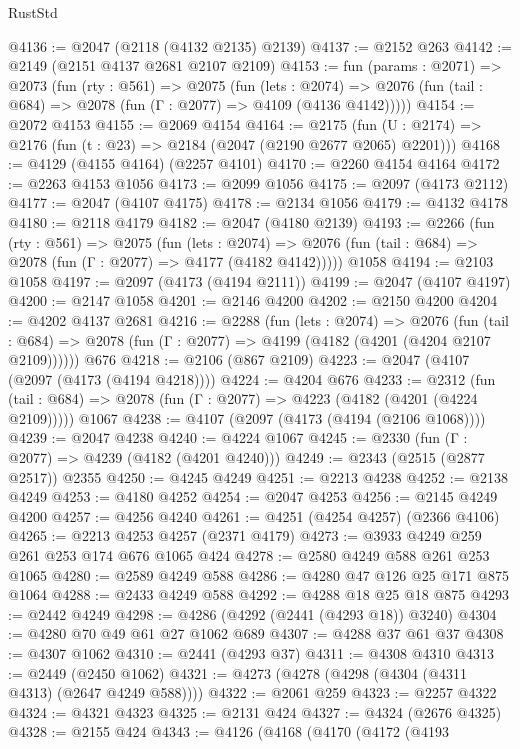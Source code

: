 \begin{lexlean}{RustStd}
\begin{coremodule}
@4136 := @2047 (@2118 (@4132 @2135) @2139)
@4137 := @2152 @263
@4142 := @2149 (@2151 @4137 @2681 @2107 @2109)
@4153 := fun (params : @2071) =>
  @2073
    (fun (rty : @561) =>
    @2075
      (fun (lets : @2074) =>
      @2076 (fun (tail : @684) => @2078 (fun (Γ : @2077) => @4109 (@4136 @4142)))))
@4154 := @2072 @4153
@4155 := @2069 @4154
@4164 := @2175 (fun (U : @2174) => @2176 (fun (t : @23) => @2184 (@2047 (@2190 @2677 @2065) @2201)))
@4168 := @4129 (@4155 @4164) (@2257 @4101)
@4170 := @2260 @4154 @4164
@4172 := @2263 @4153 @1056
@4173 := @2099 @1056
@4175 := @2097 (@4173 @2112)
@4177 := @2047 (@4107 @4175)
@4178 := @2134 @1056
@4179 := @4132 @4178
@4180 := @2118 @4179
@4182 := @2047 (@4180 @2139)
@4193 := @2266
    (fun (rty : @561) =>
    @2075
      (fun (lets : @2074) =>
      @2076 (fun (tail : @684) => @2078 (fun (Γ : @2077) => @4177 (@4182 @4142)))))
    @1058
@4194 := @2103 @1058
@4197 := @2097 (@4173 (@4194 @2111))
@4199 := @2047 (@4107 @4197)
@4200 := @2147 @1058
@4201 := @2146 @4200
@4202 := @2150 @4200
@4204 := @4202 @4137 @2681
@4216 := @2288
    (fun (lets : @2074) =>
    @2076
      (fun (tail : @684) => @2078 (fun (Γ : @2077) => @4199 (@4182 (@4201 (@4204 @2107 @2109))))))
    @676
@4218 := @2106 (@867 @2109)
@4223 := @2047 (@4107 (@2097 (@4173 (@4194 @4218))))
@4224 := @4204 @676
@4233 := @2312
    (fun (tail : @684) => @2078 (fun (Γ : @2077) => @4223 (@4182 (@4201 (@4224 @2109)))))
    @1067
@4238 := @4107 (@2097 (@4173 (@4194 (@2106 @1068))))
@4239 := @2047 @4238
@4240 := @4224 @1067
@4245 := @2330 (fun (Γ : @2077) => @4239 (@4182 (@4201 @4240)))
@4249 := @2343 (@2515 (@2877 @2517)) @2355
@4250 := @4245 @4249
@4251 := @2213 @4238
@4252 := @2138 @4249
@4253 := @4180 @4252
@4254 := @2047 @4253
@4256 := @2145 @4249 @4200
@4257 := @4256 @4240
@4261 := @4251 (@4254 @4257) (@2366 @4106)
@4265 := @2213 @4253 @4257 (@2371 @4179)
@4273 := @3933 @4249 @259 @261 @253 @174 @676 @1065 @424
@4278 := @2580 @4249 @588 @261 @253 @1065
@4280 := @2589 @4249 @588
@4286 := @4280 @47 @126 @25 @171 @875 @1064
@4288 := @2433 @4249 @588
@4292 := @4288 @18 @25 @18 @875
@4293 := @2442 @4249
@4298 := @4286 (@4292 (@2441 (@4293 @18)) @3240)
@4304 := @4280 @70 @49 @61 @27 @1062 @689
@4307 := @4288 @37 @61 @37
@4308 := @4307 @1062
@4310 := @2441 (@4293 @37)
@4311 := @4308 @4310
@4313 := @2449 (@2450 @1062)
@4321 := @4273 (@4278 (@4298 (@4304 (@4311 @4313) (@2647 @4249 @588))))
@4322 := @2061 @259
@4323 := @2257 @4322
@4324 := @4321 @4323
@4325 := @2131 @424
@4327 := @4324 (@2676 @4325)
@4328 := @2155 @424
@4343 := @4126
    (@4168
      (@4170
        (@4172
          (@4193

\end{coremodule}
\end{lexlean}
